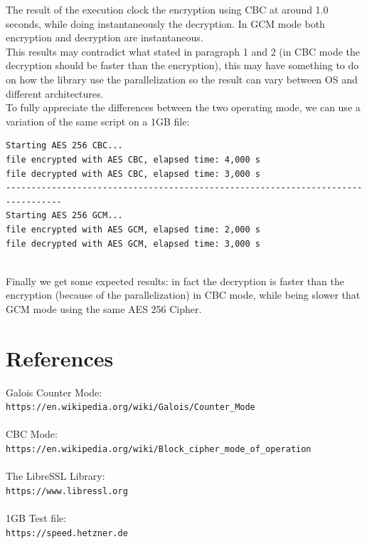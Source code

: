 \documentclass{article}
\begin{document}
The result of the execution clock the encryption using CBC at around 1.0 seconds, while doing instantaneously the decryption.
In GCM mode both encryption and decryption are instantaneous.\\
This results may contradict what stated in paragraph 1 and 2 (in CBC mode the decryption should be faster than the encryption), this may have something to do on how the library use the parallelization so the result can vary between OS and different architectures.\\To fully appreciate the differences between the two operating mode, we can use a variation of the same script on a 1GB file:

\begin{verbatim}
Starting AES 256 CBC...
file encrypted with AES CBC, elapsed time: 4,000 s
file decrypted with AES CBC, elapsed time: 3,000 s
---------------------------------------------------------------------------------
Starting AES 256 GCM...
file encrypted with AES GCM, elapsed time: 2,000 s
file decrypted with AES GCM, elapsed time: 3,000 s


\end{verbatim}
Finally we get some expected results: in fact the decryption is faster than the encryption (because of the parallelization) in CBC mode, while being slower that GCM mode using the same AES 256 Cipher.

\section{References}

	Galois Counter Mode:\\
	 \verb|https://en.wikipedia.org/wiki/Galois/Counter_Mode|\\
	 \\CBC Mode:\\
	 \verb|https://en.wikipedia.org/wiki/Block_cipher_mode_of_operation|\\
	\\The LibreSSL Library:\\
	 \verb|https://www.libressl.org|\\
	 \\1GB Test file:\\
	 \verb|https://speed.hetzner.de|\\
	
\end{document}
